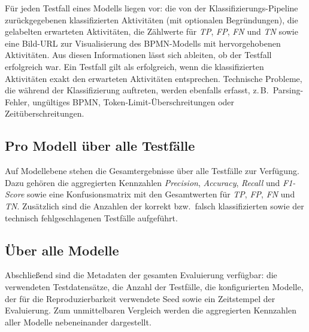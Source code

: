 Für jeden Testfall eines Modells liegen vor: die von der Klassifizierungs-Pipeline zurückgegebenen klassifizierten Aktivitäten (mit optionalen Begründungen), die gelabelten erwarteten Aktivitäten, die Zählwerte für \emph{\ac{TP}}, \emph{\ac{FP}}, \emph{\ac{FN}} und \emph{\ac{TN}} sowie eine Bild-URL zur Visualisierung des \ac{BPMN}-Modells mit hervorgehobenen Aktivitäten. Aus diesen Informationen lässt sich ableiten, ob der Testfall erfolgreich war. Ein Testfall gilt als erfolgreich, wenn die klassifizierten Aktivitäten exakt den erwarteten Aktivitäten entsprechen. Technische Probleme, die während der Klassifizierung auftreten, werden ebenfalls erfasst, z.\,B.\ Parsing-Fehler, ungültiges \ac{BPMN}, Token-Limit-Überschreitungen oder Zeitüberschreitungen.

\subsection*{Pro Modell über alle Testfälle}

Auf Modellebene stehen die Gesamtergebnisse über alle Testfälle zur Verfügung. Dazu gehören die aggregierten Kennzahlen \emph{Precision}, \emph{Accuracy}, \emph{Recall} und \emph{F1-Score} sowie eine Konfusionsmatrix mit den Gesamtwerten für \emph{\ac{TP}}, \emph{\ac{FP}}, \emph{\ac{FN}} und \emph{\ac{TN}}. Zusätzlich sind die Anzahlen der korrekt bzw.\ falsch klassifizierten sowie der technisch fehlgeschlagenen Testfälle aufgeführt.

\subsection*{Über alle Modelle}

Abschließend sind die Metadaten der gesamten Evaluierung verfügbar: die verwendeten Testdatensätze, die Anzahl der Testfälle, die konfigurierten Modelle, der für die Reproduzierbarkeit verwendete Seed sowie ein Zeitstempel der Evaluierung. Zum unmittelbaren Vergleich werden die aggregierten Kennzahlen aller Modelle nebeneinander dargestellt.
